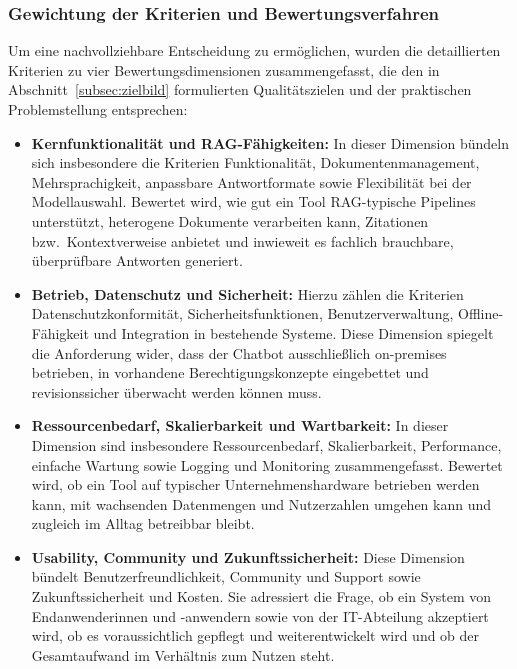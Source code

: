 \subsubsection{Gewichtung der Kriterien und Bewertungsverfahren}

Um eine nachvollziehbare Entscheidung zu ermöglichen, wurden die detaillierten Kriterien zu vier Bewertungsdimensionen zusammengefasst, die den in Abschnitt~\ref{subsec:zielbild} formulierten Qualitätszielen und der praktischen Problemstellung entsprechen:
\vspace{1cm}
\FloatBarrier
\begin{itemize}
    \item \textbf{Kernfunktionalität und RAG-Fähigkeiten:} In dieser Dimension bündeln sich insbesondere die Kriterien Funktionalität, Dokumentenmanagement, Mehrsprachigkeit, anpassbare Antwortformate sowie Flexibilität bei der Modellauswahl. Bewertet wird, wie gut ein Tool RAG-typische Pipelines unterstützt, heterogene Dokumente verarbeiten kann, Zitationen bzw.\ Kontextverweise anbietet und inwieweit es fachlich brauchbare, überprüfbare Antworten generiert.
    \item \textbf{Betrieb, Datenschutz und Sicherheit:} Hierzu zählen die Kriterien Datenschutzkonformität, Sicherheitsfunktionen, Benutzerverwaltung, Offline-Fähigkeit und Integration in bestehende Systeme. Diese Dimension spiegelt die Anforderung wider, dass der Chatbot ausschließlich on-premises betrieben, in vorhandene Berechtigungskonzepte eingebettet und revisionssicher überwacht werden können muss.
    \item \textbf{Ressourcenbedarf, Skalierbarkeit und Wartbarkeit:} In dieser Dimension sind insbesondere Ressourcenbedarf, Skalierbarkeit, Performance, einfache Wartung sowie Logging und Monitoring zusammengefasst. Bewertet wird, ob ein Tool auf typischer Unternehmenshardware betrieben werden kann, mit wachsenden Datenmengen und Nutzerzahlen umgehen kann und zugleich im Alltag betreibbar bleibt.
    \item \textbf{Usability, Community und Zukunftssicherheit:} Diese Dimension bündelt Benutzerfreundlichkeit, Community und Support sowie Zukunftssicherheit und Kosten. Sie adressiert die Frage, ob ein System von Endanwenderinnen und -anwendern sowie von der IT-Abteilung akzeptiert wird, ob es voraussichtlich gepflegt und weiterentwickelt wird und ob der Gesamtaufwand im Verhältnis zum Nutzen steht.
\end{itemize}
\vspace{1cm}
\FloatBarrier
